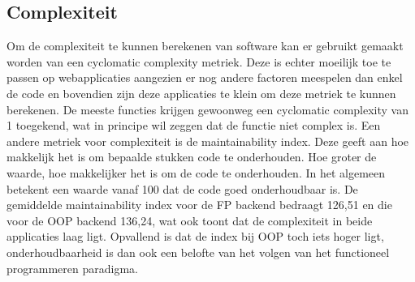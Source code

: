 \subsection{Complexiteit}
Om de complexiteit te kunnen berekenen van software kan er gebruikt gemaakt worden van een cyclomatic complexity metriek. Deze is echter moeilijk toe te passen op webapplicaties aangezien er nog andere factoren meespelen dan enkel de code en bovendien zijn deze applicaties te klein om deze metriek te kunnen berekenen. De meeste functies krijgen gewoonweg een cyclomatic complexity van 1 toegekend, wat in principe wil zeggen dat de functie niet complex is. Een andere metriek voor complexiteit is de maintainability index. Deze geeft aan hoe makkelijk het is om bepaalde stukken code te onderhouden. Hoe groter de waarde, hoe makkelijker het is om de code te onderhouden. In het algemeen betekent een waarde vanaf 100 dat de code goed onderhoudbaar is. De gemiddelde maintainability index voor de FP backend bedraagt 126,51 en die voor de OOP backend 136,24, wat ook toont dat de complexiteit in beide applicaties laag ligt. Opvallend is dat de index bij OOP toch iets hoger ligt, onderhoudbaarheid is dan ook een belofte van het volgen van het functioneel programmeren paradigma. 
